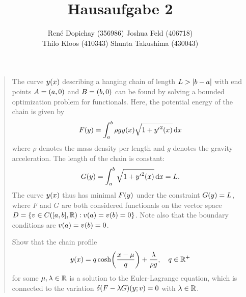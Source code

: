 \documentclass{exercise}
\title{Hausaufgabe 2}
\author{René Dopichay (356986) \quad Joshua Feld (406718)\\Thilo Kloos (410343) \quad Shunta Takushima (430043)}
\begin{document}
	\maketitle


	\section{}

	\begin{quote}
		The curve \(y\parentheses*{x}\) describing a hanging chain of length \(L > \absolute*{b - a}\) with end points \(A = \parentheses*{a, 0}\) and \(B = \parentheses*{b, 0}\) can be found by solving a bounded optimization problem for functionals.
		Here, the potential energy of the chain is given by
		\[
			F\parentheses*{y} = \int_a^b \rho gy\parentheses*{x}\sqrt{1 + {y'}^2\parentheses*{x}}\d x
		\]
		where \(\rho\) denotes the mass density per length and \(g\) denotes the gravity acceleration.
		The length of the chain is constant:
		\[
			G\parentheses*{y} = \int_a^b \sqrt{1 + {y'}^2\parentheses*{x}}\d x = L.
		\]
		The curve \(y\parentheses*{x}\) thus has minimal \(F\parentheses*{y}\) under the constraint \(G\parentheses*{y} = L\), where \(F\) and \(G\) are both considered functionals on the vector space \(D = \braces*{v \in C\parentheses*{\brackets*{a, b}, \R} : v\parentheses*{a} = v\parentheses*{b} = 0}\).
		Note also that the boundary conditions are \(v\parentheses*{a} = v\parentheses*{b} = 0\).

		Show that the chain profile
		\[
			y\parentheses*{x} = q\cosh\parentheses*{\frac{x - \mu}{q}} + \frac{\lambda}{\rho g}, \quad q \in \R^+
		\]
		for some \(\mu, \lambda \in \R\) is a solution to the Euler-Lagrange equation, which is connected to the variation \(\delta\parentheses*{F - \lambda G}\parentheses*{y; v} = 0\) with \(\lambda \in \R\).
	\end{quote}
\end{document}
